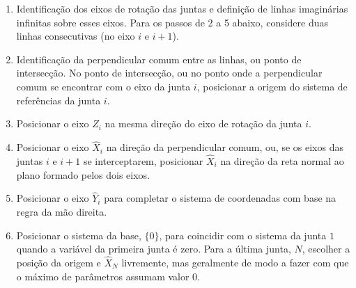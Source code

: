 \begin{enumerate}
    \item   Identificação dos eixos de rotação das juntas e definição de linhas imaginárias
            infinitas sobre esses eixos. Para os passos de 2 a 5 abaixo, considere duas linhas
            consecutivas (no eixo $i$ e $i+1$).
    \item   Identificação da perpendicular comum entre as linhas, ou ponto de intersecção.
            No ponto de intersecção, ou no ponto onde a perpendicular comum se encontrar com 
            o eixo da junta $i$, posicionar a origem do sistema de referências da junta $i$.
    \item   Posicionar o eixo $\hat{Z}_i$ na mesma direção do eixo de rotação da junta $i$.
    \item   Posicionar o eixo $\hat{X}_i$ na direção da perpendicular comum, ou, se os eixos 
            das juntas $i$ e $i+1$ se interceptarem, posicionar $\hat{X}_i$ na direção da reta normal
            ao plano formado pelos dois eixos.
    \item   Posicionar o eixo $\hat{Y}_i$ para completar o sistema de coordenadas com base na regra da mão direita.
    \item   Posicionar o sistema da base, $\{0\}$, para coincidir com o sistema da junta ${1}$ quando 
            a variável da primeira junta é zero. Para a última junta, ${N}$, escolher a posição da origem e $\hat{X}_N$
            livremente, mas geralmente de modo a fazer com que o máximo de parâmetros assumam valor 0. 
\end{enumerate}